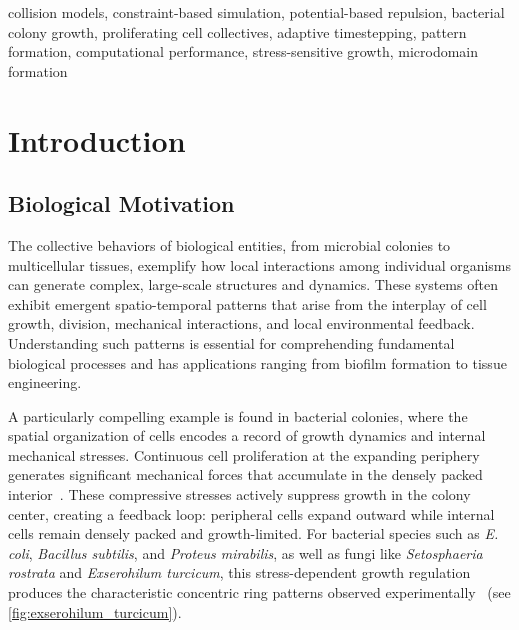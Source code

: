 \documentclass[conference]{IEEEtran}
\begin{document}
\begin{IEEEkeywords}
    collision models, constraint-based simulation, potential-based repulsion, bacterial colony growth, proliferating cell collectives, adaptive timestepping, pattern formation, computational performance, stress-sensitive growth, microdomain formation
\end{IEEEkeywords}

\section{Introduction}
\subsection{Biological Motivation}

The collective behaviors of biological entities, from microbial colonies to multicellular tissues, exemplify how local interactions among individual organisms can generate complex, large-scale structures and dynamics. These systems often exhibit emergent spatio-temporal patterns that arise from the interplay of cell growth, division, mechanical interactions, and local environmental feedback. Understanding such patterns is essential for comprehending fundamental biological processes and has applications ranging from biofilm formation to tissue engineering.

A particularly compelling example is found in bacterial colonies, where the spatial organization of cells encodes a record of growth dynamics and internal mechanical stresses. Continuous cell proliferation at the expanding periphery generates significant mechanical forces that accumulate in the densely packed interior~\cite{Wittmann2023}. These compressive stresses actively suppress growth in the colony center, creating a feedback loop: peripheral cells expand outward while internal cells remain densely packed and growth-limited. For bacterial species such as \textit{E. coli}, \textit{Bacillus subtilis}, and \textit{Proteus mirabilis}, as well as fungi like \textit{Setosphaeria rostrata} and \textit{Exserohilum turcicum}, this stress-dependent growth regulation produces the characteristic concentric ring patterns observed experimentally~\cite{YAMAZAKI2005136} (see \autoref{fig:exserohilum_turcicum}).
\end{document}
